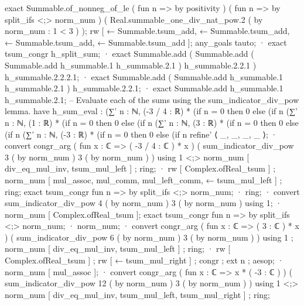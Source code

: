{          exact Summable.of_nonneg_of_le ( fun n => by positivity ) ( fun n => by split_ifs <;> norm_num ) ( Real.summable_one_div_nat_pow.2 ( by norm_num : 1 < 3 ) );
      rw [ ← Summable.tsum_add, ← Summable.tsum_add, ← Summable.tsum_add, ← Summable.tsum_add ];
      any_goals tauto;
      · exact tsum_congr h_split_sum;
      · exact Summable.add ( Summable.add ( Summable.add h_summable.1 h_summable.2.1 ) h_summable.2.2.1 ) h_summable.2.2.2.1;
      · exact Summable.add ( Summable.add h_summable.1 h_summable.2.1 ) h_summable.2.2.1;
      · exact Summable.add h_summable.1 h_summable.2.1;
    -- Evaluate each of the sums using the sum_indicator_div_pow lemma.
    have h_sum_eval : (∑' n : ℕ, (-3 / 4 : ℝ) * (if n = 0 then 0 else (if n %
                       (∑' n : ℕ, (1 : ℝ) * (if n = 0 then 0 else (if n %
                       (∑' n : ℕ, (3 : ℝ) * (if n = 0 then 0 else (if n %
                       (∑' n : ℕ, (-3 : ℝ) * (if n = 0 then 0 else (if n %
                         refine' ⟨ _, _, _, _ ⟩;
                         · convert congr_arg ( fun x : ℂ => ( -3 / 4 : ℂ ) * x ) ( sum_indicator_div_pow 3 ( by norm_num ) 3 ( by norm_num ) ) using 1 <;> norm_num [ div_eq_mul_inv, tsum_mul_left ] ; ring;
                           · rw [ Complex.ofReal_tsum ] ; norm_num [ mul_assoc, mul_comm, mul_left_comm, ← tsum_mul_left ] ; ring;
                             exact tsum_congr fun n => by split_ifs <;> norm_num;
                           · ring;
                         · convert sum_indicator_div_pow 4 ( by norm_num ) 3 ( by norm_num ) using 1;
                           · norm_num [ Complex.ofReal_tsum ];
                             exact tsum_congr fun n => by split_ifs <;> norm_num;
                           · norm_num;
                         · convert congr_arg ( fun x : ℂ => ( 3 : ℂ ) * x ) ( sum_indicator_div_pow 6 ( by norm_num ) 3 ( by norm_num ) ) using 1 ; norm_num [ div_eq_mul_inv, tsum_mul_left ] ; ring;
                           · rw [ Complex.ofReal_tsum ] ; rw [ ← tsum_mul_right ] ; congr ; ext n ; aesop;
                           · norm_num [ mul_assoc ];
                         · convert congr_arg ( fun x : ℂ => x * ( -3 : ℂ ) ) ( sum_indicator_div_pow 12 ( by norm_num ) 3 ( by norm_num ) ) using 1 <;> norm_num [ div_eq_mul_inv, tsum_mul_left, tsum_mul_right ] ; ring;
}
